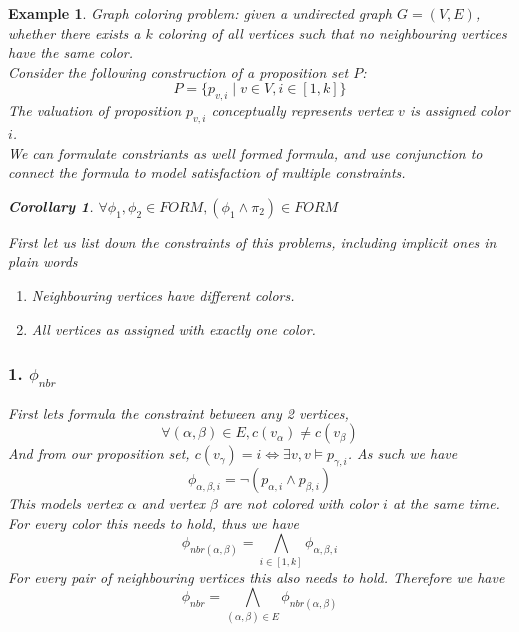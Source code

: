\documentclass{article}
\newtheorem{corollary}[theorem]{Corollary}
\newtheorem{example}[theorem]{Example}
\begin{document}
\begin{example}
    Graph coloring problem: given a undirected graph $G = (V, E)$, whether there exists a $k$ coloring of all vertices such that no neighbouring vertices have the same color.\\
    Consider the following construction of a proposition set $P$:
    \[P = \{p_{v, i} \mid v \in V, i \in [1, k]\}\]
    The valuation of proposition $p_{v, i}$ conceptually represents vertex $v$ is assigned color $i$. \\
    We can formulate constriants as well formed formula, and use conjunction to connect the formula to model satisfaction of multiple constraints. 
    \begin{corollary}
        $\forall \phi_1, \phi_2 \in FORM, (\phi_1 \land \pi_2) \in FORM$
    \end{corollary}
    First let us list down the constraints of this problems, including implicit ones in plain words
    \begin{enumerate}
        \item Neighbouring vertices have different colors.
        \item All vertices as assigned with exactly one color.
    \end{enumerate}
    \subsubsection*{1. $\phi_{nbr}$}
    First lets formula the constraint between any 2 vertices, 
    \[\forall (\alpha, \beta) \in E, c(v_\alpha) \neq c(v_\beta)\]
    And from our proposition set, $c(v_\gamma) = i \iff \exists v, v\models p_{\gamma, i}$. As such we have 
    \[\phi_{\alpha, \beta, i} = \neg(p_{\alpha, i} \land p_{\beta, i})\]
    This models vertex $\alpha$ and vertex $\beta$ are not colored with color $i$ at the same time.
    For every color this needs to hold, thus we have 
    \[\phi_{nbr(\alpha, \beta)} = \bigwedge_{i \in [1, k]} \phi_{\alpha, \beta, i}\]
    For every pair of neighbouring vertices this also needs to hold. Therefore we have 
    \[\phi_{nbr} = \bigwedge_{(\alpha, \beta) \in E}\phi_{nbr(\alpha, \beta)}\]

\end{example}
\end{document}
